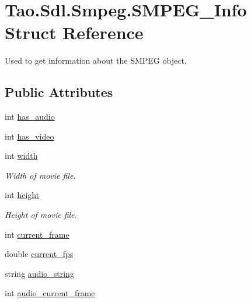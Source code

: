 \hypertarget{struct_tao_1_1_sdl_1_1_smpeg_1_1_s_m_p_e_g___info}{
\section{Tao.Sdl.Smpeg.SMPEG\_\-Info Struct Reference}
\label{struct_tao_1_1_sdl_1_1_smpeg_1_1_s_m_p_e_g___info}
}


Used to get information about the SMPEG object.  


\subsection*{Public Attributes}
\begin{DoxyCompactItemize}
\item 
int \hyperlink{struct_tao_1_1_sdl_1_1_smpeg_1_1_s_m_p_e_g___info_a239a6d860b631985cddf182c00f14510}{has\_\-audio}
\item 
int \hyperlink{struct_tao_1_1_sdl_1_1_smpeg_1_1_s_m_p_e_g___info_a1236f01e3011005067459ab30b4d2353}{has\_\-video}
\item 
int \hyperlink{struct_tao_1_1_sdl_1_1_smpeg_1_1_s_m_p_e_g___info_a442b1203f0b9f7b211678c00addb5217}{width}
\begin{DoxyCompactList}\small\item\em Width of movie file. \item\end{DoxyCompactList}\item 
int \hyperlink{struct_tao_1_1_sdl_1_1_smpeg_1_1_s_m_p_e_g___info_ab4c8cb6db1888d1d763dc72c158fd8f3}{height}
\begin{DoxyCompactList}\small\item\em Height of movie file. \item\end{DoxyCompactList}\item 
int \hyperlink{struct_tao_1_1_sdl_1_1_smpeg_1_1_s_m_p_e_g___info_a5e1449cc71a856574562f118157a93d6}{current\_\-frame}
\item 
double \hyperlink{struct_tao_1_1_sdl_1_1_smpeg_1_1_s_m_p_e_g___info_ada58aef3d1ec760e0f8ad4bef1bcd099}{current\_\-fps}
\item 
string \hyperlink{struct_tao_1_1_sdl_1_1_smpeg_1_1_s_m_p_e_g___info_a378421edf874fc9ddaec74d244c8b8d1}{audio\_\-string}
\item 
int \hyperlink{struct_tao_1_1_sdl_1_1_smpeg_1_1_s_m_p_e_g___info_a5d3e35548ed94184c4cfcd9dfe2bd590}{audio\_\-current\_\-frame}
\item 

\end{DoxyCompactItemize}
